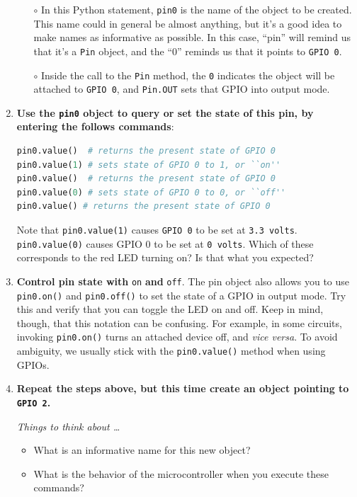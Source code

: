 \begin{enumerate}
	\begin{itemize}
		\item[$\circ$] In this Python statement, \texttt{pin0} is the name of the object to be created. 
		This name could in general be almost anything, but it's a good idea to make names as informative as possible. 
		In this case, ``pin'' will remind us that it's a \texttt{Pin} object, and the ``0'' reminds us that it points to \texttt{GPIO 0}.
	
	
	\item[$\circ$] Inside the call to the \texttt{Pin} method, the \texttt{0} indicates the object will be attached to \texttt{GPIO 0}, and \texttt{Pin.OUT} sets that GPIO into output mode.
	\end{itemize}
 
	\item \textbf{Use the \texttt{pin0} object to query or set the state of this pin, by entering the follows commands}:
\begin{lstlisting}[language=Python]
pin0.value()  # returns the present state of GPIO 0
pin0.value(1) # sets state of GPIO 0 to 1, or ``on''
pin0.value()  # returns the present state of GPIO 0
pin0.value(0) # sets state of GPIO 0 to 0, or ``off''
pin0.value() # returns the present state of GPIO 0
\end{lstlisting}
	Note that \texttt{pin0.value(1)} causes \texttt{GPIO 0} to be set at \texttt{3.3 volts}.
	\texttt{pin0.value(0)} causes GPIO 0 to be set at \texttt{0 volts}.
	Which of these corresponds to the red LED turning on? Is that what you expected? 
	
	\item \textbf{Control pin state with } \lstinline{on} \textbf{and} \lstinline{off}.
	The pin object also allows you to use \lstinline{pin0.on()} and \lstinline{pin0.off()} to set the state of a GPIO in output mode. 
	Try this and verify that you can toggle the LED on and off.
	Keep in mind, though, that this notation can be confusing. 
	For example, in some circuits, invoking \lstinline{pin0.on()} turns an attached device  off, and \textit{vice versa}. 
	To avoid ambiguity, we usually stick with the \lstinline{pin0.value()} method when using GPIOs.
	
	\item \textbf{Repeat the steps above, but this time create an object pointing to \texttt{GPIO 2}.}
	
	\emph{Things to think about \dots}
	\begin{itemize}
		\item What is an informative name for this new object? 
		\item What is the behavior of the microcontroller when you execute these commands?
	\end{itemize}
\end{enumerate}

